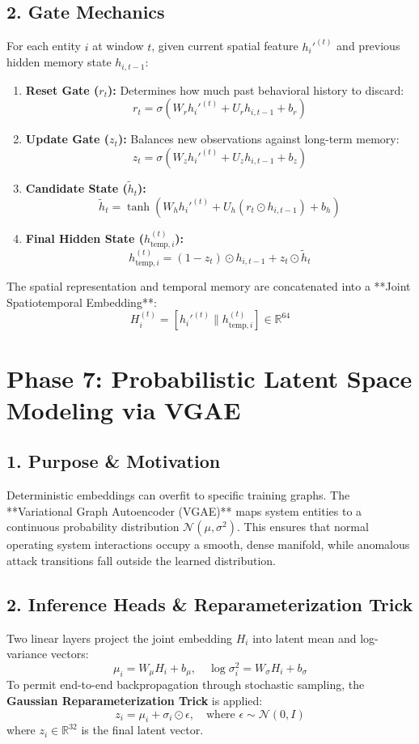 \documentclass[11pt,a4paper]{report}
\begin{document}
\subsection{2. Gate Mechanics}
For each entity $i$ at window $t$, given current spatial feature $h_i'^{(t)}$ and previous hidden memory state $h_{i, t-1}$:
\begin{enumerate}
    \item \textbf{Reset Gate ($r_t$):} Determines how much past behavioral history to discard:
    $$r_t = \sigma(W_r h_i'^{(t)} + U_r h_{i, t-1} + b_r)$$
    \item \textbf{Update Gate ($z_t$):} Balances new observations against long-term memory:
    $$z_t = \sigma(W_z h_i'^{(t)} + U_z h_{i, t-1} + b_z)$$
    \item \textbf{Candidate State ($\tilde{h}_t$):}
    $$\tilde{h}_t = \tanh(W_h h_i'^{(t)} + U_h (r_t \odot h_{i, t-1}) + b_h)$$
    \item \textbf{Final Hidden State ($h_{\text{temp}, i}^{(t)}$):}
    $$h_{\text{temp}, i}^{(t)} = (1 - z_t) \odot h_{i, t-1} + z_t \odot \tilde{h}_t$$
\end{enumerate}
The spatial representation and temporal memory are concatenated into a **Joint Spatiotemporal Embedding**:
$$H_i^{(t)} = [h_i'^{(t)} \parallel h_{\text{temp}, i}^{(t)}] \in \mathbb{R}^{64}$$

\section{Phase 7: Probabilistic Latent Space Modeling via VGAE}

\subsection{1. Purpose \& Motivation}
Deterministic embeddings can overfit to specific training graphs. The **Variational Graph Autoencoder (VGAE)** maps system entities to a continuous probability distribution $\mathcal{N}(\mu, \sigma^2)$. This ensures that normal operating system interactions occupy a smooth, dense manifold, while anomalous attack transitions fall outside the learned distribution.

\subsection{2. Inference Heads \& Reparameterization Trick}
Two linear layers project the joint embedding $H_i$ into latent mean and log-variance vectors:
$$\mu_i = W_\mu H_i + b_\mu, \quad \log \sigma_i^2 = W_\sigma H_i + b_\sigma$$
To permit end-to-end backpropagation through stochastic sampling, the \textbf{Gaussian Reparameterization Trick} is applied:
$$z_i = \mu_i + \sigma_i \odot \epsilon, \quad \text{where } \epsilon \sim \mathcal{N}(0, I)$$
where $z_i \in \mathbb{R}^{32}$ is the final latent vector.
\end{document}
